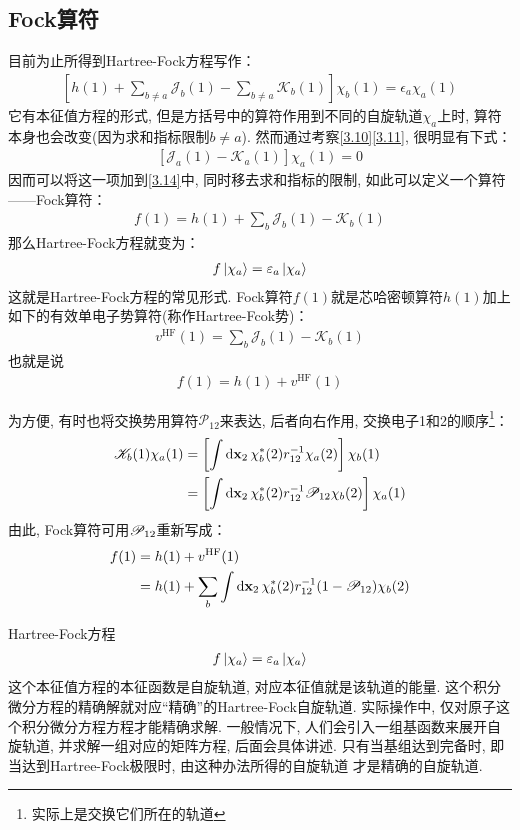 \subsection{Fock算符}
目前为止所得到Hartree-Fock方程写作：
\begin{align}
	\label{3.14}
	\left[ h(1) + \sum_{b\neq a}\mathscr{J}_b(1) - \sum_{b\neq a}\mathscr{K}_b(1)   \right]\chi_b(1) = \epsilon_a\chi_a(1)
\end{align}
它有本征值方程的形式, 
但是方括号中的算符作用到不同的自旋轨道$\chi_a$上时, 
算符本身也会改变(因为求和指标限制$b\neq a$). 
然而通过考察\autoref{3.10}\autoref{3.11}, 
很明显有下式：
\begin{align}
	\left[ \mathscr{J}_a(1) - \mathscr{K}_a(1)  \right]\chi_a(1) = 0
\end{align}
因而可以将这一项加到\autoref{3.14}中, 
同时移去求和指标的限制, 
如此可以定义一个算符——Fock算符：
\begin{align}
	\label{3.16}
	f(1) = h(1) + \sum_{b}\mathscr{J}_b(1) - \mathscr{K}_b(1)
\end{align}
那么Hartree-Fock方程就变为：
\begin{align}
	\label{3.17}
	f\Ket{\chi_a} = \varepsilon_a\Ket{\chi_a}
\end{align}
这就是Hartree-Fock方程的常见形式. 
Fock算符$f(1)$就是芯哈密顿算符$h(1)$加上如下的有效单电子势算符(称作Hartree-Fcok势)：
\begin{align}
	\label{3.18}
	v^\mathrm{HF}(1) = \sum_b\mathscr{J}_b(1) - \mathscr{K}_b(1)
\end{align}
也就是说
\begin{align}
	f(1) = h(1) + v^\mathrm{HF}(1)
\end{align}

为方便, 有时也将交换势用算符$\mathscr{P}_{12}$来表达, 后者向右作用, 交换电子1和2的顺序\footnote{实际上是交换它们所在的轨道}：
\begin{align}
	\scr{K}_b(1)\chi_a(1) & = \left[ \int\dd{x}_2\,\chi_b^*(2)r_{12}^{-1}\chi_a(2) \right]\chi_b(1)\notag\\
	& = \left[ \int\dd{x}_2\,\chi_b^*(2)r_{12}^{-1}\scr{P}_{12}\chi_b(2) \right]\chi_a(1)
\end{align}
由此, 
Fock算符可用$\mathscr{P}_{12}$重新写成：
\begin{align}
	f(1) & = h(1) + v^\mathrm{HF}(1) \notag \\
	& = h(1) + \sum_b\int\dd{x}_2\,\chi_b^*(2)\twoe(1-\scr{P}_{12})\chi_b(2)
\end{align}

Hartree-Fock方程
\begin{align}
	f\Ket{\chi_a} = \varepsilon_a\Ket{\chi_a}
\end{align}
这个本征值方程的本征函数是自旋轨道, 
对应本征值就是该轨道的能量. 
这个积分微分方程的精确解就对应“精确”的Hartree-Fock自旋轨道. 
实际操作中, 
仅对原子这个积分微分方程方程才能精确求解. 
一般情况下, 
人们会引入一组基函数来展开自旋轨道, 
并求解一组对应的矩阵方程, 
后面会具体讲述. 
只有当基组达到完备时, 
即当达到Hartree-Fock极限时, 
由这种办法所得的自旋轨道 才是精确的\hft 自旋轨道.


